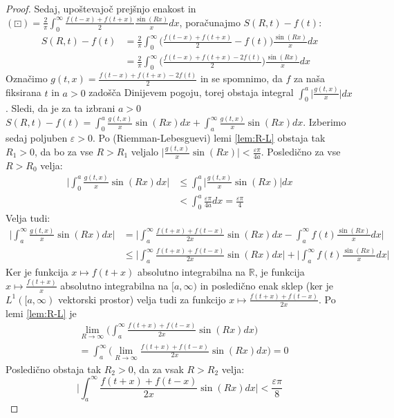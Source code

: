 \documentclass[a4paper, 10pt]{article}
\newcommand{\abs}[1]{\ensuremath{\lvert #1 \rvert}}
\newcommand{\mth}[1]{\ensuremath{\mathbb{#1}}}
\newcommand{\R}{\mth{R}}
\begin{document}
\begin{proof}
				Sedaj, upoštevajoč prejšnjo enakost in $(\boxdot) = \frac{2}{\pi}\int_{0}^{\infty}\frac{f(t-x) + f(t+x)}{2}\frac{\sin(Rx)}{x}dx$, poračunajmo $S(R, t) - f(t)$: \begin{align*}
					S(R, t) - f(t) &= \frac{2}{\pi}\int_{0}^{\infty}\big(\frac{f(t-x) + f(t+x)}{2} - f(t)\big)\frac{\sin(Rx)}{x}dx \\
					&= \frac{2}{\pi}\int_{0}^{\infty}\big(\frac{f(t-x) + f(t+x)-2f(t)}{2}\big)\frac{\sin(Rx)}{x}dx
				\end{align*}
				Označimo $g(t, x) = \frac{f(t-x) + f(t+x)-2f(t)}{2}$ in se spomnimo, da $f$ za naša fiksirana $t$ in $a>0$ zadošča Dinijevem pogoju, torej obstaja integral $\int_{0}^{a}\abs{\frac{g(t, x)}{x}}dx$. Sledi, da je za ta izbrani $a>0$ $S(R, t) - f(t) =\int_{0}^{a}\frac{g(t, x)}{x}\sin(Rx)dx + \int_{a}^{\infty}\frac{g(t, x)}{x}\sin(Rx)dx$. Izberimo sedaj poljuben $\varepsilon>0$. Po (Riemman-Lebesguevi) lemi \ref{lem:R-L} obstaja tak $R_1 > 0$, da bo za vse $R > R_1$ veljalo $\abs{\frac{g(t, x)}{x}\sin(Rx)} < \frac{\varepsilon\pi}{4a}$. Posledično za vse $R>R_0$ velja: \begin{align*} 
					\abs{\int_{0}^{a}\frac{g(t, x)}{x}\sin(Rx)dx} &\leq \int_{0}^{a}\abs{\frac{g(t, x)}{x}\sin(Rx)}dx \\
					&< \int_{0}^{a}\frac{\varepsilon\pi}{4a}dx = \frac{\varepsilon\pi}{4}
				\end{align*} 
					Velja tudi: \begin{align*}
						\abs{\int_{a}^{\infty}\frac{g(t, x)}{x}\sin(Rx)dx} &= \abs{\int_{a}^{\infty}\frac{f(t+x) + f(t-x)}{2x}\sin(Rx)dx - \int_{a}^{\infty}f(t)\frac{\sin(Rx)}{x}dx} \\
						&\leq \abs{\int_{a}^{\infty}\frac{f(t+x) + f(t-x)}{2x}\sin(Rx)dx} + \abs{\int_{a}^{\infty}f(t)\frac{\sin(Rx)}{x}dx}
					\end{align*}
					Ker je funkcija $x \mapsto f(t+x)$ absolutno integrabilna na $\R$, je funkcija $x\mapsto\frac{f(t+x)}{x}$ absolutno integrabilna na $[a, \infty)$ in posledično enak sklep (ker je $L^1([a, \infty)$ vektorski prostor) velja tudi za funkcijo $x\mapsto\frac{f(t+x) + f(t-x)}{2x}$. Po lemi \ref{lem:R-L} je \begin{align*}
						&\lim_{R\to\infty}\big(\int_{a}^{\infty}\frac{f(t+x) + f(t-x)}{2x}\sin(Rx)dx\big) \\ &= \int_{a}^{\infty}\big(\lim_{R\to\infty}\frac{f(t+x) + f(t-x)}{2x}\sin(Rx)dx\big) = 0
					\end{align*} Posledično obstaja tak $R_2 >0$, da za vsak $R>R_2$ velja: $$\abs{\int_{a}^{\infty}\frac{f(t+x) + f(t-x)}{2x}\sin(Rx)dx} < \frac{\varepsilon\pi}{8}$$
					

\end{proof}
\end{document}
